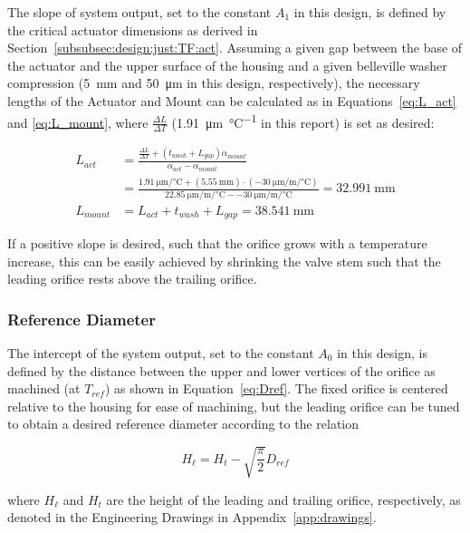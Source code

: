 \documentclass[12pt, letterpaper]{report}%
\newcounter{mycounter}           %
\newcounter{sub}[mycounter]      %
\newcommand{\specActuatorCTE}{\SI{22.85}{\micro\meter\per\meter\per\celsius}} %
\newcommand{\specMountCTE}{\SI{-30}{\micro\meter\per\meter\per\celsius}}
\newcommand{\specOrigActuatorLength}{\SI{32.991}{\milli \meter}}
\newcommand{\GA}{\SI{1.91}{\micro\meter\per\celsius}}
\begin{document}
\begin{appendices}
				The slope of system output, set to the constant $A_1$ in this design, is defined by the critical actuator dimensions as derived in Section~\ref{subsubsec:design:just:TF:act}.
				Assuming a given gap between the base of the actuator and the upper surface of the housing and a given belleville washer compression
				(\SI{5}{\milli\meter} and \SI{50}{\micro\meter} in this design, respectively), the necessary lengths of the Actuator and Mount can be calculated as in Equations~\eqref{eq:L_act} and \eqref{eq:L_mount},
				where $\frac{\Delta L}{\Delta T}$ (\SI{1.91}{\micro\meter\per\degreeCelsius} in this report) is set as desired:

				\begin{align*}
					L_{act} &= \frac{\frac{\Delta L}{\Delta T} + (t_{wash} + L_{gap}) \alpha_{mount}}{\alpha_{act} - \alpha_{mount}} \\[12pt]
					&= \frac{\GA + (\SI{5.55}{\milli\meter}) \cdot (\specMountCTE)}{\specActuatorCTE - \specMountCTE} = \specOrigActuatorLength \\[12pt]
					L_{mount} &= L_{act} + t_{wash} + L_{gap} = \SI{38.541}{\milli\meter} 
				\end{align*}

				If a positive slope is desired, such that the orifice grows with a temperature increase, this can be easily achieved by shrinking the valve stem such that the leading orifice rests above the trailing orifice.

			\subsubsection{Reference Diameter}
			\label{app:iter:customize:RR:intercept}

				The intercept of the system output, set to the constant $A_0$ in this design, is defined by the distance between the upper and lower vertices of the orifice as machined (at $T_{ref}$)
				as shown in Equation~\eqref{eq:Dref}. The fixed orifice is centered relative to the housing for ease of machining, but the leading orifice can be tuned to obtain a desired reference diameter
				according to the relation

				\begin{equation}
					H_{\ell} = H_t - \sqrt{\frac{\pi}{2}} D_{ref}
				\end{equation}

				where $H_{\ell}$ and $H_t$ are the height of the leading and trailing orifice, respectively, as denoted in the Engineering Drawings in Appendix~\ref{app:drawings}.



\end{appendices}
\end{document}
